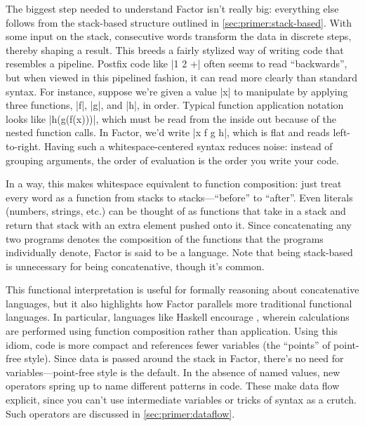 The biggest step needed to understand Factor isn't really big: everything else
follows from the stack-based structure outlined in
\ref{sec:primer:stack-based}.  With some input on the stack, consecutive words
transform the data in discrete steps, thereby shaping a result.  This breeds a
fairly stylized way of writing code that resembles a pipeline.  Postfix code
like \inlinecode|1 2 +| often seems to read ``backwards'', but when viewed in
this pipelined fashion, it can read more clearly than standard syntax.  For
instance, suppose we're given a value \inlinecode|x| to manipulate by applying
three functions, \inlinecode|f|, \inlinecode|g|, and \inlinecode|h|, in order.
Typical function application notation looks like \inlinecode|h(g(f(x)))|, which
must be read from the inside out because of the nested function calls.  In
Factor, we'd write \inlinecode|x f g h|, which is flat and reads left-to-right.
Having such a whitespace-centered syntax reduces noise: instead of grouping
arguments, the order of evaluation is the order you write your code.

In a way, this makes whitespace equivalent to function composition: just treat
every word as a function from stacks to stacks---``before'' to ``after''.  Even
literals (numbers, strings, etc.) can be thought of as functions that take in a
stack and return that stack with an extra element pushed onto it.  Since
concatenating any two programs denotes the composition of the functions that
the programs individually denote, Factor is said to be a 
language.  Note that being stack-based is
unnecessary for being concatenative, though it's common.

This functional interpretation is useful for formally reasoning about
concatenative languages, but it also highlights how Factor
parallels more traditional functional languages.  In particular, languages like
Haskell encourage , wherein calculations are performed
using function composition rather than application.  Using this
idiom, code is more compact and references fewer variables (the ``points'' of
point-free style).  Since data is passed around the stack in Factor, there's no
need for variables---point-free style is the default.  In the absence of named
values, new operators spring up to name different patterns in code.  These make
data flow explicit, since you can't use intermediate variables or tricks of
syntax as a crutch.  Such operators are discussed in \ref{sec:primer:dataflow}.

